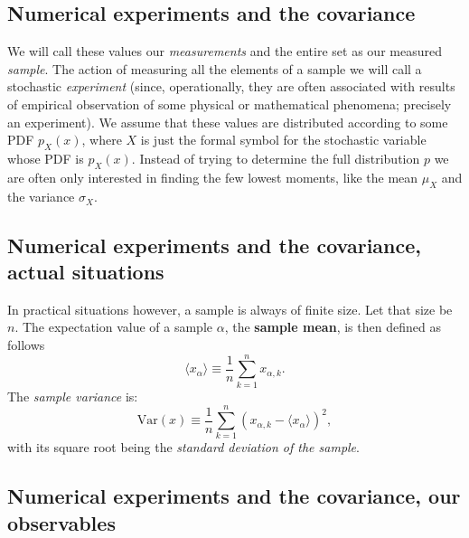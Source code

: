 \documentclass[%
oneside,                 %
final,                   %
10pt]{article}
\newenvironment{block_mdfboxadmon}[1][]{
\begin{block_mdfboxmdframed}[frametitle=#1]
}
{
\end{block_mdfboxmdframed}
}
\begin{document}
\subsection{Numerical experiments and the covariance}

\begin{block_mdfboxadmon}[]
We will call these
values our \emph{measurements} and the entire set as our measured
\emph{sample}.  The action of measuring all the elements of a sample
we will call a stochastic \emph{experiment} (since, operationally,
they are often associated with results of empirical observation of
some physical or mathematical phenomena; precisely an experiment). We
assume that these values are distributed according to some 
PDF $p_X^{\phantom X}(x)$, where $X$ is just the formal symbol for the
stochastic variable whose PDF is $p_X^{\phantom X}(x)$. Instead of
trying to determine the full distribution $p$ we are often only
interested in finding the few lowest moments, like the mean
$\mu_X^{\phantom X}$ and the variance $\sigma_X^{\phantom X}$.
\end{block_mdfboxadmon} %




\subsection{Numerical experiments and the covariance, actual situations}

\begin{block_mdfboxadmon}[]
In practical situations however, a sample is always of finite size. Let that
size be $n$. The expectation value of a sample $\alpha$, the \textbf{sample mean}, is then defined as follows
\begin{equation*}
\langle x_{\alpha} \rangle \equiv \frac{1}{n}\sum_{k=1}^n x_{\alpha,k}.
\end{equation*}
The \emph{sample variance} is:
\begin{equation*}
\mathrm{Var}(x) \equiv \frac{1}{n}\sum_{k=1}^n (x_{\alpha,k} - \langle x_{\alpha} \rangle)^2,
\end{equation*}
with its square root being the \emph{standard deviation of the sample}.
\end{block_mdfboxadmon} %




\subsection{Numerical experiments and the covariance, our observables}
\end{document}
